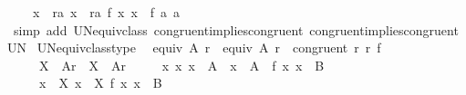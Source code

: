 \begin{isabellebody}
\ \ \ \ {\isacharparenleft}{\kern0pt}{\isasymUnion}x{}\ {\isasymin}\ r{}{\isacharbackquote}{\kern0pt}{\isacharbackquote}{\kern0pt}{\isacharbraceleft}{\kern0pt}a{}{\isacharbraceright}{\kern0pt}{\isachardot}{\kern0pt}\ {\isasymUnion}x{}\ {\isasymin}\ r{}{\isacharbackquote}{\kern0pt}{\isacharbackquote}{\kern0pt}{\isacharbraceleft}{\kern0pt}a{}{\isacharbraceright}{\kern0pt}{\isachardot}{\kern0pt}\ f\ x{}\ x{}{\isacharparenright}{\kern0pt}\ {\isacharequal}{\kern0pt}\ f\ a{}\ a{}{\isachardoublequoteclose}\isanewline
%
\isadelimproof
\ \ %
\endisadelimproof
%
\isatagproof
{}\isamarkupfalse%
\ {\isacharparenleft}{\kern0pt}simp\ add{\isacharcolon}{\kern0pt}\ UN{\isacharunderscore}{\kern0pt}equiv{\isacharunderscore}{\kern0pt}class\ congruent{}{\isacharunderscore}{\kern0pt}implies{\isacharunderscore}{\kern0pt}congruent\ congruent{}{\isacharunderscore}{\kern0pt}implies{\isacharunderscore}{\kern0pt}congruent{\isacharunderscore}{\kern0pt}UN{\isacharparenright}{\kern0pt}%
\endisatagproof
{\isafoldproof}%
%
\isadelimproof
\isanewline
%
\endisadelimproof
\isanewline
{}\isamarkupfalse%
\ UN{\isacharunderscore}{\kern0pt}equiv{\isacharunderscore}{\kern0pt}class{\isacharunderscore}{\kern0pt}type{}{\isacharcolon}{\kern0pt}\isanewline
\ \ {\isachardoublequoteopen}equiv\ A{}\ r{}\ {\isasymLongrightarrow}\ equiv\ A{}\ r{}\ {\isasymLongrightarrow}\ congruent{}\ r{}\ r{}\ f\isanewline
\ \ \ \ {\isasymLongrightarrow}\ X{}\ {\isasymin}\ A{}{\isacharslash}{\kern0pt}{\isacharslash}{\kern0pt}r{}\ {\isasymLongrightarrow}\ X{}\ {\isasymin}\ A{}{\isacharslash}{\kern0pt}{\isacharslash}{\kern0pt}r{}\isanewline
\ \ \ \ {\isasymLongrightarrow}\ {\isacharparenleft}{\kern0pt}{\isasymAnd}x{}\ x{}{\isachardot}{\kern0pt}\ x{}\ {\isasymin}\ A{}\ {\isasymLongrightarrow}\ x{}\ {\isasymin}\ A{}\ {\isasymLongrightarrow}\ f\ x{}\ x{}\ {\isasymin}\ B{\isacharparenright}{\kern0pt}\isanewline
\ \ \ \ {\isasymLongrightarrow}\ {\isacharparenleft}{\kern0pt}{\isasymUnion}x{}\ {\isasymin}\ X{}{\isachardot}{\kern0pt}\ {\isasymUnion}x{}\ {\isasymin}\ X{}{\isachardot}{\kern0pt}\ f\ x{}\ x{}{\isacharparenright}{\kern0pt}\ {\isasymin}\ B{\isachardoublequoteclose}\isanewline

\end{isabellebody}

